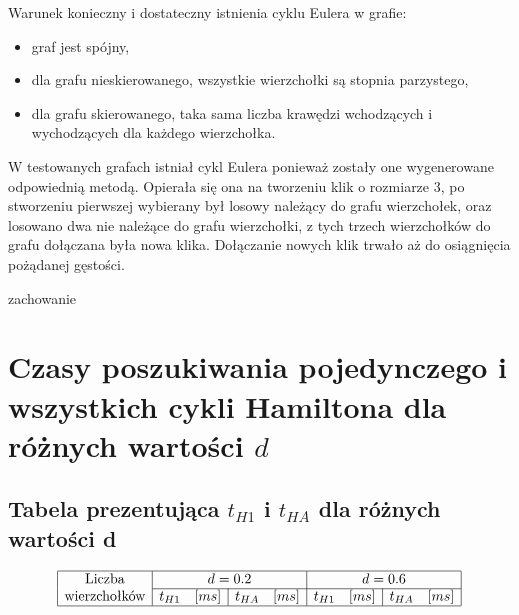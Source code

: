 \documentclass[polish,polish,a4paper]{article}
\begin{document}
\begin{spacing}{1.25}
Warunek konieczny i dostateczny istnienia cyklu Eulera w grafie:
\begin{spacing}{0.5}
	\begin{itemize}
		\item graf jest spójny,
		\item dla grafu nieskierowanego, wszystkie wierzchołki są stopnia parzystego,
		\item dla grafu skierowanego, taka sama liczba krawędzi wchodzących i wychodzących dla każdego wierzchołka.
	\end{itemize}
\end{spacing}

W testowanych grafach istniał cykl Eulera ponieważ zostały one wygenerowane odpowiednią metodą.
Opierała się ona na tworzeniu klik o rozmiarze 3, po stworzeniu pierwszej wybierany był losowy należący do grafu wierzchołek, oraz losowano dwa nie należące do grafu wierzchołki, z tych trzech wierzchołków do grafu dołączana była nowa klika. Dołączanie nowych klik trwało aż do osiągnięcia pożądanej gęstości.

{\huge zachowanie}




\section{Czasy poszukiwania pojedynczego i wszystkich cykli Hamiltona dla różnych wartości $d$}


\begin{spacing}{1.5}
	{\centering \subsection*{Tabela prezentująca $t_{H1}$ i $t_{HA}$ dla różnych wartości d}}
	\begin{equation*}
	\begin{array}{|r|r|r|r|r|}
	\hline
	\multicolumn{1}{|c|}{$Liczba$}&
	\multicolumn{2}{c|}{d = 0.2}&
	\multicolumn{2}{c|}{d = 0.6}\\\cline{2-5}
	\multicolumn{1}{|c|}{$wierzchołków$}&
	\multicolumn{1}{c|}{t_{H1} \quad [ms]}&
	\multicolumn{1}{c|}{t_{HA} \quad [ms]}&
	\multicolumn{1}{c|}{t_{H1} \quad [ms]}&
	\multicolumn{1}{c|}{t_{HA} \quad [ms]}\\
	\hline
	\end{array}
	\end{equation*}
\end{spacing}



\end{spacing}
\end{document}
